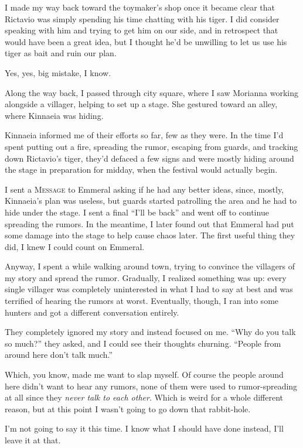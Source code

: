 I made my way back toward the toymaker's shop once it became clear that Rictavio was simply spending his time chatting with his tiger. I did consider speaking with him and trying to get him on our side, and in retrospect that would have been a great idea, but I thought he'd be unwilling to let us use his tiger as bait and ruin our plan.

Yes, yes, big mistake, I know.

Along the way back, I passed through city square, where I saw Morianna working alongside a villager, helping to set up a stage. She gestured toward an alley, where Kinnaeia was hiding.

Kinnaeia informed me of their efforts so far, few as they were. In the time I'd spent putting out a fire, spreading the rumor, escaping from guards, and tracking down Rictavio's tiger, they'd defaced a few signs and were mostly hiding around the stage in preparation for midday, when the festival would actually begin.

I sent a \textsc{Message} to Emmeral asking if he had any better ideas, since, mostly, Kinnaeia's plan was useless, but guards started patrolling the area and he had to hide under the stage. I sent a final ``I'll be back'' and went off to continue spreading the rumors. In the meantime, I later found out that Emmeral had put some damage into the stage to help cause chaos later. The first useful thing they did, I knew I could count on Emmeral.

Anyway, I spent a while walking around town, trying to convince the villagers of my story and spread the rumor. Gradually, I realized something was up: every single villager was completely uninterested in what I had to say at best and was terrified of hearing the rumors at worst. Eventually, though, I ran into some hunters and got a different conversation entirely.

They completely ignored my story and instead focused on me. ``Why do you talk so much?'' they asked, and I could see their thoughts churning. ``People from around here don't talk much.''

Which, you know, made me want to slap myself. Of course the people around here didn't want to hear any rumors, none of them were used to rumor-spreading at all since they \emph{never talk to each other}. Which is weird for a whole different reason, but at this point I wasn't going to go down that rabbit-hole.

I'm not going to say it this time. I know what I should have done instead, I'll leave it at that.

